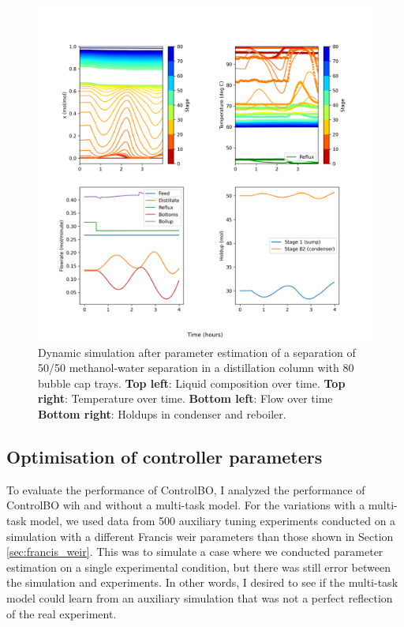 \begin{figure}
    \centering
    \includegraphics[width=\textwidth]{gfx/Chapter06/2021_11_17_closed_loop_dynamic.png}
    \caption{Dynamic simulation after parameter estimation of a separation of 50/50 methanol-water separation in a distillation column with 80 bubble cap trays. \textbf{Top left}: Liquid composition over time. \textbf{Top right}: Temperature over time. \textbf{Bottom left}: Flow over time \textbf{Bottom right}: Holdups in condenser and reboiler.}
    \label{fig:dynamic_nominal}
\end{figure}

\subsection{Optimisation of controller parameters}

To evaluate the performance of ControlBO, I analyzed the performance of ControlBO wih and without a multi-task model.  For the variations with a multi-task model, we used data from  500 auxiliary tuning experiments conducted on a simulation with a different Francis weir parameters than those shown in Section \ref{sec:francis_weir}. This was to simulate a case where we conducted parameter estimation on a single experimental condition, but there was still error between the simulation and experiments. In other words, I desired to see if the multi-task model could learn from an auxiliary simulation that was not a perfect reflection of the real experiment.  

